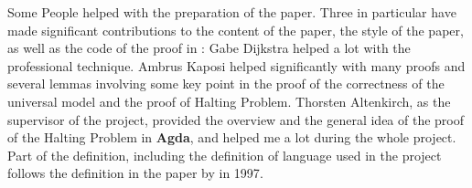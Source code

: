 \begin{acknowledgements}
Some People helped with the preparation of the paper. 
Three in particular have made significant contributions to the content of the paper, the style of the paper, as well as the code of the proof in \Agda:
Gabe Dijkstra helped a lot with the professional \Agda technique.
Ambrus Kaposi helped significantly with many proofs and several lemmas involving some key point in the proof of the correctness of the universal model and the proof of Halting Problem.
Thorsten Altenkirch, as the supervisor of the project, provided the overview and the general idea of the proof of the Halting Problem in \textbf{Agda}, and helped me a lot during the whole project.\\
Part of the definition, including the definition of \WHILE language used in the project follows the definition in the paper  by  in 1997\cite{jones_computability_1997}.
\end{acknowledgements}